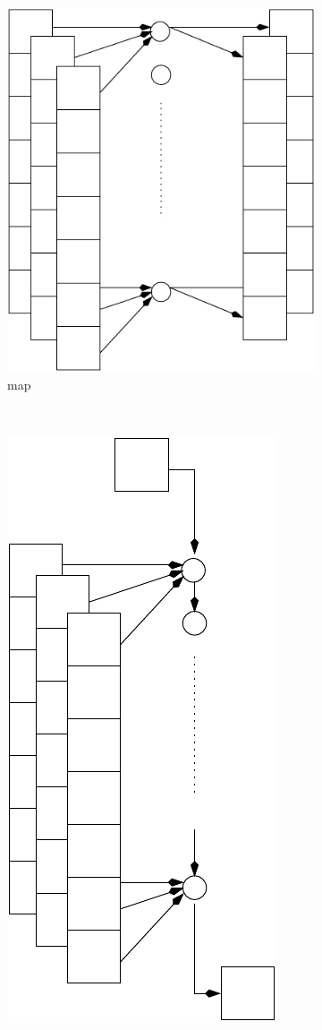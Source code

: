  \begin{figure}[t!]
    \begin{subfigure}[t]{0.25\textwidth}
  \centering
  \includegraphics[scale=0.45]{fig/map.pdf}
  \caption{map}
  \label{fig:map}
    \end{subfigure}%
    ~ 
    \begin{subfigure}[t]{0.22\textwidth}
  \centering
  \includegraphics[scale=0.45]{fig/red.pdf}

\end{subfigure}
\end{figure}
